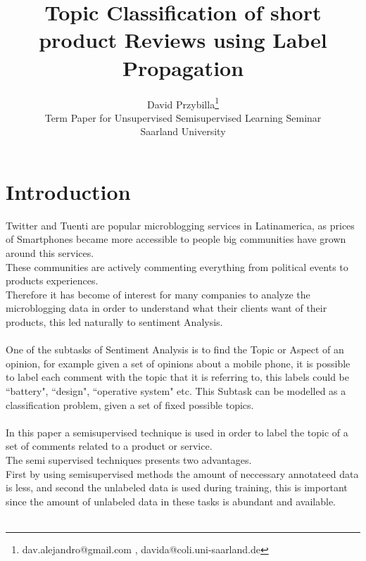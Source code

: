 \documentclass[4pt,a4paper,twocolumn]{article}
\author{David Przybilla\footnote{dav.alejandro@gmail.com , davida@coli.uni-saarland.de}\\ Term Paper for Unsupervised Semisupervised
Learning Seminar\\ Saarland University}
\title{Topic Classification of short product Reviews using Label Propagation}
\begin{document}
\twocolumn[
	 \begin{@twocolumnfalse}
    \maketitle
   \begin{abstract}
      ...
    \end{abstract}
  \end{@twocolumnfalse}
  ]




\part*{Introduction}
Twitter and Tuenti are popular microblogging services in Latinamerica,
as prices of Smartphones became more accessible to people big communities
have grown around this services.\\
These communities are actively commenting everything from political events to products experiences.\\
Therefore it has become of interest for many companies to analyze the microblogging data in order to understand
what their clients want of their products, this led naturally to sentiment Analysis.\\ 
\\
One of the subtasks of Sentiment Analysis is to find the Topic or Aspect of an opinion,
for example given a set of opinions about a mobile phone, it is possible to label each comment
with the topic that it is referring to, this labels could be ``battery", ``design", ``operative system" etc.
This Subtask can be modelled as a classification problem, given a set of fixed possible topics.\\
\\
In this paper a semisupervised technique is used in order to label the topic of a set of comments 
related to a product or service.\\
The semi supervised techniques presents two advantages.\\
First by using semisupervised methods the amount of neccessary annotateed data is less,
and second the unlabeled data is used during training, this is important since the amount of unlabeled data in these tasks is abundant and available.\\
\\
\end{document}
